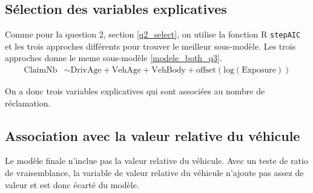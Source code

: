\documentclass{article}
\begin{document}
	\subsection{Sélection des variables explicatives}
	
	Comme pour la question 2, section \ref{q2_select}, on utilise la fonction R \texttt{stepAIC} et les trois approches différents pour trouver le meilleur sous-modèle. Les trois approches donne le meme sous-modèle \eqref{modele_both_q3}.
	\begin{align}\label{modele_both_q3}
	\mathrm{ClaimNb} &\sim \mathrm{DrivAge + VehAge + VehBody + offset(log(Exposure))
	}
	\end{align}	
 
	On a donc trois variables explicatives qui sont associées au nombre de réclamation.
	
	\subsection{Association avec la valeur relative du véhicule}
	Le modèle finale n'inclue pas la valeur relative du véhicule. Avec un teste de ratio de vraisemblance, la variable de valeur relative du véhicule n'ajoute pas assez de valeur et est donc écarté du modèle.
	
	\appendix
\end{document}
